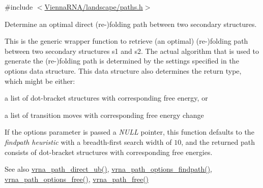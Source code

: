 {\ttfamily \#include $<$\mbox{\hyperlink{paths_8h}{Vienna\+R\+N\+A/landscape/paths.\+h}}$>$}



Determine an optimal direct (re-\/)folding path between two secondary structures. 

This is the generic wrapper function to retrieve (an optimal) (re-\/)folding path between two secondary structures {\ttfamily s1} and {\ttfamily s2}. The actual algorithm that is used to generate the (re-\/)folding path is determined by the settings specified in the {\ttfamily options} data structure. This data structure also determines the return type, which might be either\+:
\begin{DoxyItemize}
\item a list of dot-\/bracket structures with corresponding free energy, or
\item a list of transition moves with corresponding free energy change
\end{DoxyItemize}

If the {\ttfamily options} parameter is passed a {\itshape N\+U\+LL} pointer, this function defaults to the {\itshape findpath heuristic} \cite{flamm:2001} with a breadth-\/first search width of $ 10 $, and the returned path consists of dot-\/bracket structures with corresponding free energies.

\begin{DoxySeeAlso}{See also}
\mbox{\hyperlink{group__paths__direct_ga51d9edaeb42d1d178ea8ba46ccd4c8c0}{vrna\+\_\+path\+\_\+direct\+\_\+ub()}}, \mbox{\hyperlink{group__paths__direct_ga3790a24ca64d68acfa6e67b525151a5f}{vrna\+\_\+path\+\_\+options\+\_\+findpath()}}, \mbox{\hyperlink{group__paths_gaa64a86b13cb165346a0d0c788781512a}{vrna\+\_\+path\+\_\+options\+\_\+free()}}, \mbox{\hyperlink{group__paths_ga3763dc16760d09277a1b1c3f3061d0c7}{vrna\+\_\+path\+\_\+free()}}
\end{DoxySeeAlso}


